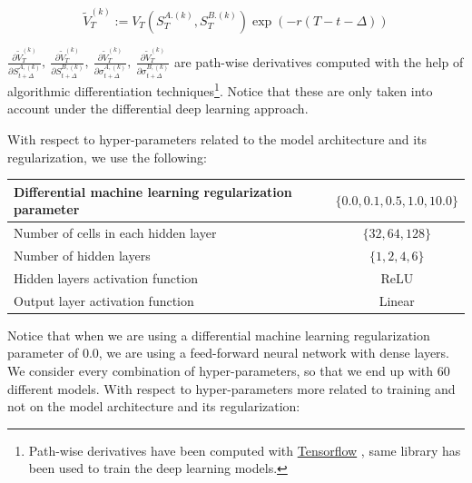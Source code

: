 $$\tilde{V}_{T}^{(k)} := V_T\left(S_T^{A.(k)}, S_T^{B.(k)}\right)\exp\left(-r\left(T-t-\Delta\right)\right)$$

$\frac{\partial \tilde{V}_{T}^{(k)}}{\partial S_{t+\Delta}^{A,(k)}},\  
\frac{\partial \tilde{V}_{T}^{(k)}}{\partial S_{t+\Delta}^{B,(k)}},\ 
\frac{\partial \tilde{V}_{T}^{(k)}}{\partial \sigma_{t+\Delta}^{A,(k)}},\ 
\frac{\partial \tilde{V}_{T}^{(k)}}{\partial \sigma_{t+\Delta}^{B,(k)}}
$ are path-wise derivatives computed with the help of algorithmic differentiation techniques\footnote{Path-wise derivatives have been computed with \href{www.Tensorflow.org}{Tensorflow} , same library has been used to train the deep learning models. }. Notice that these are only taken into account under the differential deep learning approach.

With respect to hyper-parameters related to the model architecture and its regularization, we use the following:


  \jorge{$\checkmark$}

\begin{center}
\begin{tabular}{||l | c||} 
 \hline
 Differential machine learning regularization parameter & $\{0.0, 0.1, 0.5, 1.0, 10.0\}$ \\
 \hline
 Number of cells in each hidden layer  & $\{32, 64, 128\}$  \\
 \hline
 Number of hidden layers  & $\{1 ,2 ,4 ,6\}$  \\
 \hline
 Hidden layers activation function  & ReLU  \\
 \hline
 Output layer activation function  & Linear  \\
 \hline
 
 \end{tabular}
\end{center}


Notice that when we are using a differential machine learning regularization parameter of 0.0, we are using a feed-forward neural network with dense layers. We consider every combination of hyper-parameters, so that we end up with $60$ different models. With respect to hyper-parameters more related to training and not on the model architecture and its regularization:

